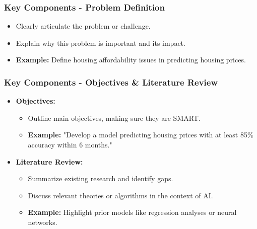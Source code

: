 \documentclass{beamer}
\begin{document}
\begin{frame}[fragile]
    \frametitle{Key Components - Problem Definition}
    \begin{itemize}
        \item Clearly articulate the problem or challenge.
        \item Explain why this problem is important and its impact.
        \item \textbf{Example:} Define housing affordability issues in predicting housing prices.
    \end{itemize}
\end{frame}

\begin{frame}[fragile]
    \frametitle{Key Components - Objectives & Literature Review}
    \begin{itemize}
        \item \textbf{Objectives:}
        \begin{itemize}
            \item Outline main objectives, making sure they are SMART.
            \item \textbf{Example:} "Develop a model predicting housing prices with at least 85\% accuracy within 6 months."
        \end{itemize}

        \item \textbf{Literature Review:}
        \begin{itemize}
            \item Summarize existing research and identify gaps.
            \item Discuss relevant theories or algorithms in the context of AI.
            \item \textbf{Example:} Highlight prior models like regression analyses or neural networks.
        \end{itemize}
    \end{itemize}
\end{frame}
\end{document}
